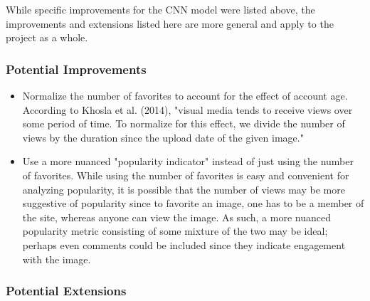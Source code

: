 \documentclass[11pt]{article}
\begin{document}
While specific improvements for the CNN model were listed above, the
improvements and extensions listed here are more general and apply to
the project as a whole.

\subsubsection{Potential Improvements}

\begin{itemize}
\item
  Normalize the number of favorites to account for the effect of account
  age. According to Khosla et al. (2014), "visual media tends to receive
  views over some period of time. To normalize for this effect, we
  divide the number of views by the duration since the upload date of
  the given image."
\item
  Use a more nuanced "popularity indicator" instead of just using the
  number of favorites. While using the number of favorites is easy and
  convenient for analyzing popularity, it is possible that the number of
  views may be more suggestive of popularity since to favorite an image,
  one has to be a member of the site, whereas anyone can view the image.
  As such, a more nuanced popularity metric consisting of some mixture
  of the two may be ideal; perhaps even comments could be included since
  they indicate engagement with the image.
\end{itemize}
\newpage
\subsubsection{Potential Extensions}
\end{document}
